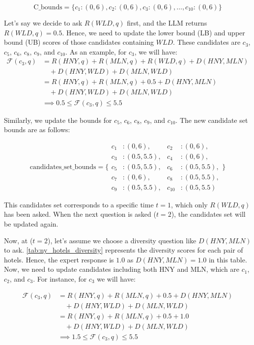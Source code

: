 \begin{example}
\[
\text{C\_bounds} = \{ c_1: (0, 6), c_2: (0, 6), c_3: (0, 6), \ldots, c_{10}: (0, 6) \}
\]

Let's say we decide to ask \( R(WLD, q) \) first, and the LLM returns \( R(WLD, q) = 0.5 \). Hence, we need to update the lower bound (LB) and upper bound (UB) scores of those candidates containing \( WLD \). These candidates are \( c_3 \), \( c_5 \), \( c_6 \), \( c_8 \), \( c_9 \), and \( c_{10} \). As an example, for \( c_3 \), we will have:
\begin{align*}
\mathcal{F}(c_3, q) & = R(HNY, q) + R(MLN, q) + R(WLD, q) + D(HNY, MLN) \\
          & \quad + D(HNY, WLD) + D(MLN, WLD) \\
          & = R(HNY, q) + R(MLN, q) + 0.5 + D(HNY, MLN) \\
          & \quad + D(HNY, WLD) + D(MLN, WLD) \\
          & \implies 0.5 \leq \mathcal{F}(c_3, q) \leq 5.5
\end{align*}

Similarly, we update the bounds for \( c_{5} \), \( c_{6} \), \( c_{8} \), \( c_{9} \), and \( c_{10} \). The new candidate set bounds are as follows:

\[
\text{candidates\_set\_bounds} = \{ 
\begin{aligned}
c_1 &: (0, 6), & c_2 &: (0, 6), \\
c_3 &: (0.5, 5.5), & c_4 &: (0, 6), \\
c_5 &: (0.5, 5.5), & c_6 &: (0.5, 5.5), \\
c_7 &: (0, 6), & c_8 &: (0.5, 5.5), \\
c_9 &: (0.5, 5.5), & c_{10} &: (0.5, 5.5) 
\end{aligned}
\}
\]


This candidates set corresponds to a specific time \( t = 1 \), which only \( R(WLD, q) \) has been asked. When the next question is asked (\( t = 2 \)), the candidates set will be updated again.

Now, at (\( t = 2 \)), let's assume we choose a diversity question like \( D(HNY, MLN) \) to ask. \autoref{tab:ny_hotels_diversity} represents the diversity scores for each pair of hotels. Hence, the expert response is \(1.0\) as \( D(HNY, MLN) = 1.0\) in this table. Now, we need to update candidates including both HNY and MLN, which are \( c_{1} \), \( c_{2} \), and \( c_{3} \). For instance, for \( c_{3} \) we will have:

\begin{align*}
\mathcal{F}(c_3, q) & = R(HNY, q) + R(MLN, q) + 0.5 + D(HNY, MLN) \\
          & \quad + D(HNY, WLD) + D(MLN, WLD) \\
          & = R(HNY, q) + R(MLN, q) + 0.5 + 1.0 \\
          & \quad + D(HNY, WLD) + D(MLN, WLD) \\
          & \implies 1.5 \leq \mathcal{F}(c_3, q) \leq 5.5
\end{align*}


\end{example}
